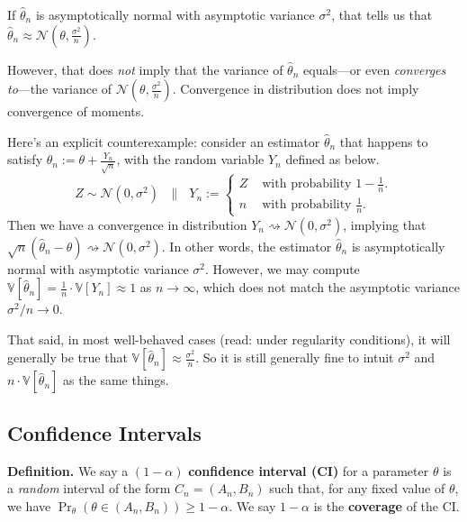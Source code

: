 \begin{remark}
    If $\hat{\theta}_n$ is asymptotically normal
    with asymptotic variance $\sigma^2$,
    that tells us that
    $\hat{\theta}_n \approx \mathcal{N}(\theta, \frac{\sigma^2}{n})$.

    However, that does \emph{not} imply that
    the variance of $\hat{\theta}_n$ equals---or even
    \emph{converges to}---the variance of
    $\mathcal{N}(\theta, \frac{\sigma^2}{n})$.
    Convergence in distribution does not imply
    convergence of moments.

    Here's an explicit counterexample:
    consider an estimator $\hat{\theta}_n$ that happens to satisfy
    $\hat{\theta}_n := \theta + \frac{Y_n}{\sqrt{n}}$,
    with the random variable $Y_n$ defined as below.
    \[ Z \sim \mathcal{N}(0, \sigma^2) ~~~ \parallel ~~~
    Y_n := \begin{cases}
    Z & \text{ with probability } 1 - \frac{1}{n}. \\
    n & \text{ with probability } \frac{1}{n}.
    \end{cases} \]
    Then we have a convergence in distribution
    $Y_n \rightsquigarrow \mathcal{N}(0, \sigma^2)$, implying that
    $\sqrt{n}(\hat{\theta}_n - \theta) \rightsquigarrow
    \mathcal{N}(0, \sigma^2)$.
    In other words, the estimator $\hat{\theta}_n$
    is asymptotically normal with asymptotic variance $\sigma^2$.
    However, we may compute
    $\mathbb{V}[\hat{\theta}_n]
    = \frac{1}{n} \cdot \mathbb{V}[Y_n] \approx 1$ as
    $n \to \infty$, which
    does not match the asymptotic variance $\sigma^2/n \to 0$.

    That said, in most well-behaved cases (read: under regularity conditions),
    it will generally be true that
    $\mathbb{V}[\hat{\theta}_n] \approx \frac{\sigma^2}{n}$.
    So it is still generally fine to intuit
    $\sigma^2$ and $n \cdot \mathbb{V}[\hat{\theta}_n]$
    as the same things.
\end{remark}

\subsection{Confidence Intervals}

\textbf{Definition.} We say a $(1 - \alpha)$ \textbf{confidence interval (CI)}
for a parameter $\theta$ is a \emph{random} interval of the form
$C_n = (A_n, B_n)$ such that, for any fixed value of $\theta$,
we have $\Pr_{\theta}(\theta \in (A_n, B_n)) \geq 1 - \alpha$.
We say $1 - \alpha$ is the \textbf{coverage} of the CI.

